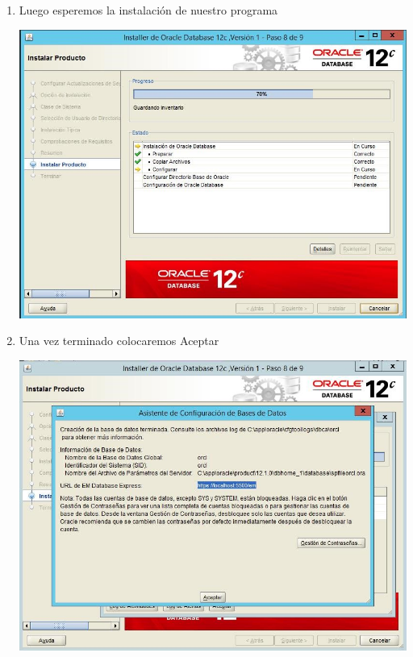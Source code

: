 \begin{enumerate}[1.]
	\item Luego esperemos la instalaci\'on de nuestro programa\\
	\begin{center}
	\includegraphics[width=15cm]{./Imagenes/img22} 
	\end{center}

	\item Una vez terminado colocaremos Aceptar\\
	\begin{center}
	\includegraphics[width=15cm]{./Imagenes/img23} 
	\end{center}


\end{enumerate}
